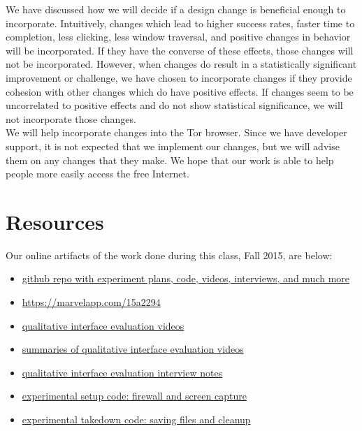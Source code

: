 \documentclass{template}
\begin{document}
 We have discussed how we will decide if a design change is beneficial enough to incorporate. Intuitively, changes which lead to higher success rates, faster time to completion, less clicking, less window traversal, and positive changes in behavior will be incorporated. If they have the converse of these effects, those changes will not be incorporated. However, when changes do result in a statistically significant improvement or challenge, we have chosen to incorporate changes if they provide cohesion with other changes which do have positive effects. If changes seem to be uncorrelated to positive effects and do not show statistical significance, we will not incorporate those changes. \\

 We will help incorporate changes into the Tor browser. Since we have developer support, it is not expected that we implement our changes, but we will advise them on any changes that they make. We hope that our work is able to help people more easily access the free Internet. 

\section{Resources}
\noindent Our online artifacts of the work done during this class, Fall 2015,
are below: 
\begin{itemize} \itemsep1pt \parskip0pt 
\item \href{https://github.com/lindanlee/circumvention-ux-tor}{github repo with experiment plans, code, videos, interviews, and much more}
\item \href {a clickable prototype of our interface redesign}{https://marvelapp.com/15a2294}
\item \href{https://github.com/lindanlee/circumvention-ux-tor/tree/master/sessions/pre/videos}{qualitative interface evaluation videos}
\item \href{https://github.com/lindanlee/circumvention-ux-tor/blob/master/sessions/pre/participant-summaries.txt}{summaries of qualitative interface evaluation videos}
\item \href{https://github.com/lindanlee/circumvention-ux-tor/tree/master/sessions/pre/notes}{qualitative interface evaluation interview notes}
\item \href{https://github.com/lindanlee/circumvention-ux-tor/blob/master/setup/setup-environment}{experimental setup code: firewall and screen capture} 
\item \href{https://github.com/lindanlee/circumvention-ux-tor/blob/master/setup/takedown-environment}{experimental takedown code: saving files and cleanup} 
\end{itemize}
\end{document}
